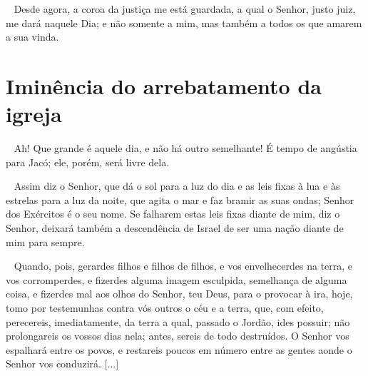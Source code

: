 \documentclass[12pt,aspectratio=169]{beamer}
\newcommand{\ver}[1]{%
    \raisebox{0.50ex}{%
        \scalebox{1.1}{%
            \pmb{\textbf{\textcolor{BSpbg}{#1}}}%
        }%
    }%
}
\newcommand{\QUOTE}[1]{%
    \par\noindent\hspace*{0.1\linewidth}%
    \begin{minipage}{0.8\linewidth}%
        \linespread{1.35}\large{#1}%
    \end{minipage}%
}
\newcommand{\WIDEQUOTE}[1]{%
    \par\noindent\hspace*{0.02\linewidth}%
    \begin{minipage}{0.92\linewidth}%
        \linespread{1.25}\large{#1}%
    \end{minipage}%
}
\newcommand{\RED}[1]{{\textcolor{TXred}{#1}}}
\newcommand{\ORA}[1]{{\textcolor{TXora}{#1}}}
\newcommand{\YEL}[1]{{\textcolor{TXyel}{#1}}}
\newcommand{\GRE}[1]{{\textcolor{TXgre}{#1}}}
\newcommand{\CYA}[1]{{\textcolor{TXcya}{#1}}}
\newcommand{\MAG}[1]{{\textcolor{TXmag}{#1}}}
\begin{document}
    \begin{frame}
        \QUOTE{%
            \ver{(ARC) 2Tm~4.8}~%
            Desde agora, a \YEL{coroa da justiça} me está guardada, a qual o  Senhor,  justo
            juiz, me dará naquele Dia; e \GRE{não somente a mim}, mas também a \MAG{todos os
            que amarem a sua vinda}.
        }
    \end{frame}

\section{Iminência do arrebatamento da igreja}

    \begin{frame}
        \QUOTE{%
            \ver{(ARC) Jr~30.7}~%
            Ah! Que grande é aquele  dia,  e  não  há  outro  semelhante!  É  \RED{tempo  de
            angústia} \MAG{para Jacó}; \CYA{ele, porém, será livre dela}.
        }
    \end{frame}

    \begin{frame}
        \QUOTE{%
            \ver{(ARA) Jr~31.35,36}~%
            Assim diz o Senhor, que dá o \YEL{sol} para a luz do dia e as \YEL{leis fixas} à
            \YEL{lua} e às \YEL{estrelas} para a luz da noite, que agita o mar e faz  bramir
            as suas ondas; Senhor dos Exércitos é o seu nome. \MAG{Se  falharem  estas  leis
            fixas diante de mim, diz o Senhor, deixará também a descendência  de  Israel  de
            ser uma nação diante de mim para sempre}.
        }
    \end{frame}

    \begin{frame}
        \WIDEQUOTE{%
            \ver{(ARC) Dt~4.25--31}~%
            Quando, pois, gerardes filhos e filhos de filhos, e vos envelhecerdes na  terra,
            \RED{e vos corromperdes}, e fizerdes alguma \RED{imagem  esculpida},  semelhança
            de alguma coisa, e fizerdes mal aos olhos do Senhor, teu Deus, para o provocar à
            ira, hoje, tomo por \RED{testemunhas contra vós outros o céu e  a  terra},  que,
            com efeito, \ORA{perecereis, imediatamente, da terra} a qual, passado o  Jordão,
            ides possuir; não prolongareis os  vossos  dias  nela;  antes,  sereis  de  todo
            destruídos. O Senhor vos \ORA{espalhará entre os povos}, e restareis \ORA{poucos
            em número entre as gentes} aonde o Senhor vos conduzirá. [...]
        }
    \end{frame}
\end{document}
